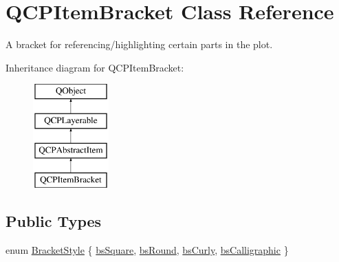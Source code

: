 \hypertarget{class_q_c_p_item_bracket}{}\section{Q\+C\+P\+Item\+Bracket Class Reference}
\label{class_q_c_p_item_bracket}


A bracket for referencing/highlighting certain parts in the plot.  


Inheritance diagram for Q\+C\+P\+Item\+Bracket\+:\begin{figure}[H]
\begin{center}
\leavevmode
\includegraphics[height=4.000000cm]{class_q_c_p_item_bracket}
\end{center}
\end{figure}
\subsection*{Public Types}
\begin{DoxyCompactItemize}
\item 
enum \hyperlink{class_q_c_p_item_bracket_a7ac3afd0b24a607054e7212047d59dbd}{Bracket\+Style} \{ \hyperlink{class_q_c_p_item_bracket_a7ac3afd0b24a607054e7212047d59dbda7f9df4a7359bfe3dac1dbe4ccf5d220c}{bs\+Square}, 
\hyperlink{class_q_c_p_item_bracket_a7ac3afd0b24a607054e7212047d59dbda394627b0830a26ee3e0a02ca67a9f918}{bs\+Round}, 
\hyperlink{class_q_c_p_item_bracket_a7ac3afd0b24a607054e7212047d59dbda5024ce4023c2d8de4221f1cd4816acd8}{bs\+Curly}, 
\hyperlink{class_q_c_p_item_bracket_a7ac3afd0b24a607054e7212047d59dbda8f29f5ef754e2dc9a9efdedb2face0f3}{bs\+Calligraphic}
 \}
\end{DoxyCompactItemize}
